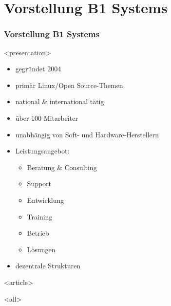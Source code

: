 
\section{Vorstellung B1 Systems}

\begin{frame}[fragile]
\frametitle<presentation>{Vorstellung B1 Systems}




\mode
<presentation>
\begin{itemize}
\item gegründet 2004
\item primär Linux/Open Source-Themen
\item national \& international tätig
\item über 100 Mitarbeiter
\item unabhängig von Soft- und Hardware-Herstellern
\item Leistungsangebot:
  \begin{itemize}
  \item Beratung \& Consulting
  \item Support
  \item Entwicklung
  \item Training
  \item Betrieb
  \item Lösungen
  \end{itemize}
\item dezentrale Strukturen
\end{itemize}

\mode
<article>

\mode
<all>

\end{frame}
\newpage

